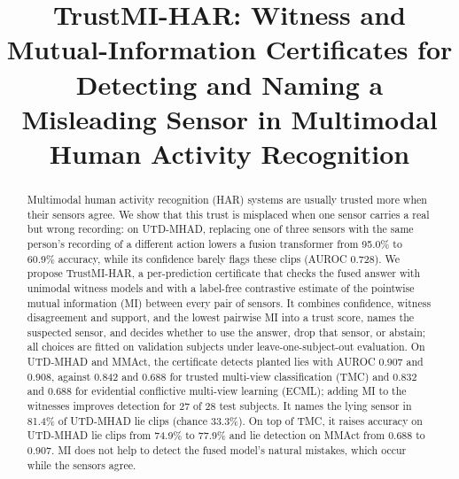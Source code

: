 \documentclass[conference]{IEEEtran}
\begin{document}
\title{TrustMI-HAR: Witness and Mutual-Information Certificates for Detecting and Naming a Misleading Sensor in Multimodal Human Activity Recognition}

\author{
}

\maketitle

\begin{abstract}
Multimodal human activity recognition (HAR) systems are usually trusted more when their sensors agree. We show that this trust is misplaced when one sensor carries a real but wrong recording: on UTD-MHAD, replacing one of three sensors with the same person's recording of a different action lowers a fusion transformer from 95.0\% to 60.9\% accuracy, while its confidence barely flags these clips (AUROC 0.728). We propose TrustMI-HAR, a per-prediction certificate that checks the fused answer with unimodal witness models and with a label-free contrastive estimate of the pointwise mutual information (MI) between every pair of sensors. It combines confidence, witness disagreement and support, and the lowest pairwise MI into a trust score, names the suspected sensor, and decides whether to use the answer, drop that sensor, or abstain; all choices are fitted on validation subjects under leave-one-subject-out evaluation. On UTD-MHAD and MMAct, the certificate detects planted lies with AUROC 0.907 and 0.908, against 0.842 and 0.688 for trusted multi-view classification (TMC) and 0.832 and 0.688 for evidential conflictive multi-view learning (ECML); adding MI to the witnesses improves detection for 27 of 28 test subjects. It names the lying sensor in 81.4\% of UTD-MHAD lie clips (chance 33.3\%). On top of TMC, it raises accuracy on UTD-MHAD lie clips from 74.9\% to 77.9\% and lie detection on MMAct from 0.688 to 0.907. MI does not help to detect the fused model's natural mistakes, which occur while the sensors agree.
\end{abstract}
\end{document}
